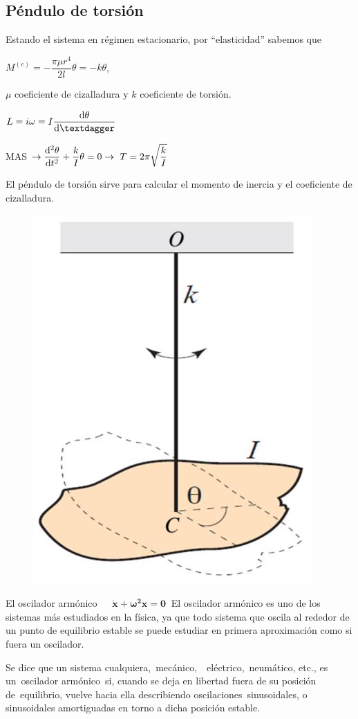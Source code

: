 { 
\subsection{Péndulo de torsión}
\begin{multicols}{2}
Estando el sistema en régimen estacionario, por ``elasticidad'' sabemos que 

$M^{(e)}=-\dfrac{\pi \mu r^4}{2l}\theta=-k\theta$, 

$\mu$ coeficiente de cizalladura y $k$ coeficiente de torsión.

$L=i\omega=I\displaystyle \dv{\theta}{†}$

MAS $ \to \displaystyle \dv[2]{\theta}{t}+ \dfrac k I \theta = 0 \to \ T=2\pi \sqrt{\dfrac k I}$

El péndulo de torsión sirve para calcular el momento de inercia y el coeficiente de cizalladura. 
\begin{figure}[H]
		\centering
		\includegraphics[width=.4\textwidth]{imagenes/imagenes19/T19IM08.png}
	\end{figure}	
\end{multicols}

\newpage %

\begin{myblock}{El oscilador armónico $\quad \boxed{\  \boldsymbol{\ddot x + \omega^2 x=0} \ }$}
El oscilador armónico es uno de los sistemas más estudiados en la física, ya que todo sistema que oscila al rededor de un punto de equilibrio estable se puede estudiar en primera aproximación como si fuera un oscilador.


\vspace{2mm} Se dice que un sistema cualquiera, mecánico,  eléctrico, neumático, etc., es un oscilador armónico si, cuando se deja en libertad fuera de su posición de equilibrio, vuelve hacia ella describiendo oscilaciones sinusoidales, o sinusoidales amortiguadas en torno a dicha posición estable.


\end{myblock}}
